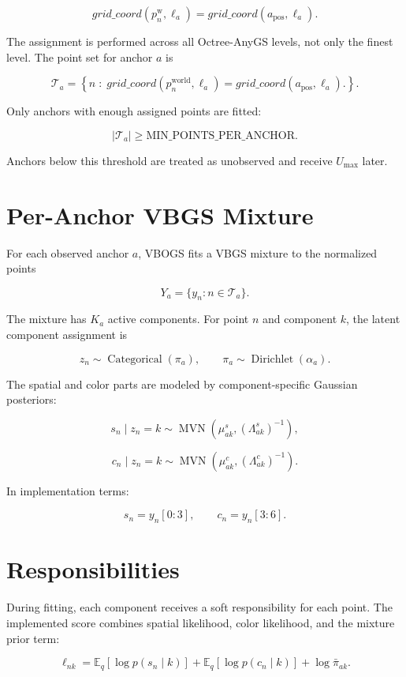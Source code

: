 \documentclass[11pt]{article}
\newcommand{\E}{\mathbb{E}}
\newcommand{\Dir}{\operatorname{Dirichlet}}
\newcommand{\Cat}{\operatorname{Categorical}}
\newcommand{\MVN}{\operatorname{MVN}}
\begin{document}
\[
  grid\_coord(p_n^{\mathrm{w}}, \ell_a) = grid\_coord(a_{\mathrm{pos}}, \ell_a).
\]

The assignment is performed across all Octree-AnyGS levels, not only the
finest level. The point set for anchor \(a\) is

\[
  \mathcal{T}_a
  =
  \left\{
    n
    \;:\;
    grid\_coord(p_n^{\mathrm{world}}, \ell_a) = grid\_coord(a_{\mathrm{pos}}, \ell_a).
  \right\}.
\]

Only anchors with enough assigned points are fitted:

\[
  |\mathcal{T}_a|
  \geq
  \mathrm{MIN\_POINTS\_PER\_ANCHOR}.
\]

Anchors below this threshold are treated as unobserved and receive \(U_{\max}\)
later.

\section{Per-Anchor VBGS Mixture}

For each observed anchor \(a\), VBOGS fits a VBGS mixture to the normalized
points

\[
  Y_a = \{y_n : n \in \mathcal{T}_a\}.
\]

The mixture has \(K_a\) active components. For point \(n\) and component \(k\),
the latent component assignment is

\[
  z_n \sim \Cat(\pi_a),
  \qquad
  \pi_a \sim \Dir(\alpha_a).
\]

The spatial and color parts are modeled by component-specific Gaussian
posteriors:

\[
  s_n \mid z_n = k
  \sim
  \MVN(\mu^s_{ak}, (\Lambda^s_{ak})^{-1}),
\]

\[
  c_n \mid z_n = k
  \sim
  \MVN(\mu^c_{ak}, (\Lambda^c_{ak})^{-1}).
\]

In implementation terms:

\[
  s_n = y_n[0:3],
  \qquad
  c_n = y_n[3:6].
\]

\section{Responsibilities}

During fitting, each component receives a soft responsibility for each point.
The implemented score combines spatial likelihood, color likelihood, and the
mixture prior term:

\[
  \ell_{nk}
  =
  \E_q[\log p(s_n \mid k)]
  +
  \E_q[\log p(c_n \mid k)]
  +
  \log \bar{\pi}_{ak}.
\]
\end{document}
